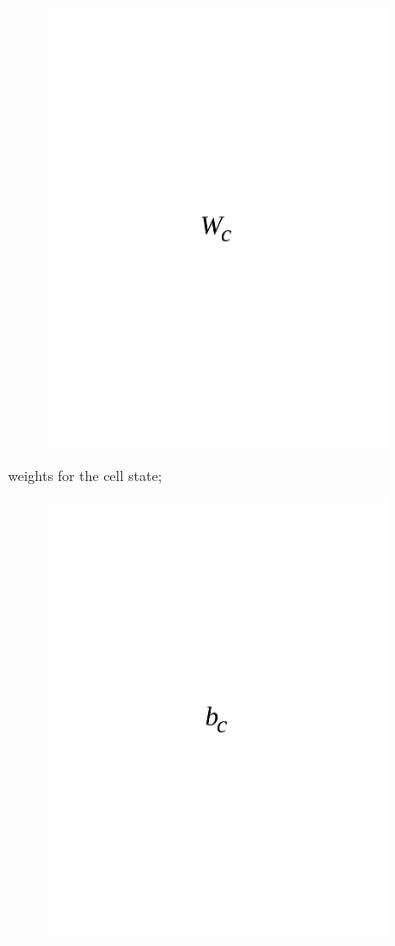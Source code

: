\begin{figure}[H]
	\centering
	\includegraphics[width=0.8\textwidth]{media/ict/image58}
	\caption*{}
\end{figure}

weights for the cell state;
\begin{figure}[H]
	\centering
	\includegraphics[width=0.8\textwidth]{media/ict/image59}
	\caption*{}
\end{figure}

